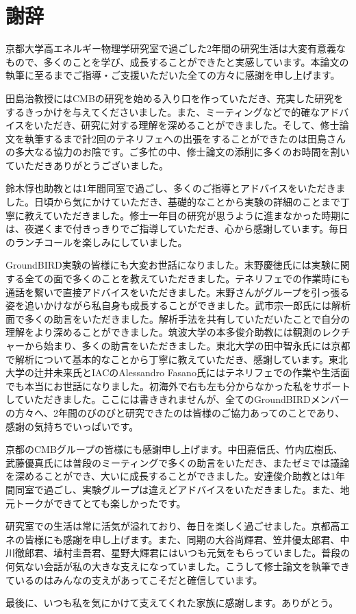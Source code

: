 \chapter{謝辞}

京都大学高エネルギー物理学研究室で過ごした2年間の研究生活は大変有意義なもので、多くのことを学び、成長することができたと実感しています。本論文の執筆に至るまでご指導・ご支援いただいた全ての方々に感謝を申し上げます。

田島治教授にはCMBの研究を始める入り口を作っていただき、充実した研究をするきっかけを与えてくださいました。また、ミーティングなどで的確なアドバイスをいただき、研究に対する理解を深めることができました。そして、修士論文を執筆するまで計2回のテネリフェへの出張をすることができたのは田島さんの多大なる協力のお陰です。ご多忙の中、修士論文の添削に多くのお時間を割いていただきありがとうございました。

鈴木惇也助教とは1年間同室で過ごし、多くのご指導とアドバイスをいただきました。日頃から気にかけていただき、基礎的なことから実験の詳細のことまで丁寧に教えていただきました。修士一年目の研究が思うように進まなかった時期には、夜遅くまで付きっきりでご指導していただき、心から感謝しています。毎日のランチコールを楽しみにしていました。

GroundBIRD実験の皆様にも大変お世話になりました。末野慶徳氏には実験に関する全ての面で多くのことを教えていただきました。テネリフェでの作業時にも通話を繋いで直接アドバイスをいただきました。末野さんがグループを引っ張る姿を追いかけながら私自身も成長することができました。武市宗一郎氏には解析面で多くの助言をいただきました。解析手法を共有していただいたことで自分の理解をより深めることができました。筑波大学の本多俊介助教には観測のレクチャーから始まり、多くの助言をいただきました。東北大学の田中智永氏には京都で解析について基本的なことから丁寧に教えていただき、感謝しています。東北大学の辻井未来氏とIACのAlessandro Fasano氏にはテネリフェでの作業や生活面でも本当にお世話になりました。初海外で右も左も分からなかった私をサポートしていただきました。ここには書ききれませんが、全てのGroundBIRDメンバーの方々へ、2年間のびのびと研究できたのは皆様のご協力あってのことであり、感謝の気持ちでいっぱいです。

京都のCMBグループの皆様にも感謝申し上げます。中田嘉信氏、竹内広樹氏、武藤優真氏には普段のミーティングで多くの助言をいただき、またゼミでは議論を深めることができ、大いに成長することができました。安達俊介助教とは1年間同室で過ごし、実験グループは違えどアドバイスをいただきました。また、地元トークができてとても楽しかったです。

研究室での生活は常に活気が溢れており、毎日を楽しく過ごせました。京都高エネの皆様にも感謝を申し上げます。また、同期の大谷尚輝君、笠井優太郎君、中川徹郎君、埴村圭吾君、星野大輝君にはいつも元気をもらっていました。普段の何気ない会話が私の大きな支えになっていました。こうして修士論文を執筆できているのはみんなの支えがあってこそだと確信しています。

最後に、いつも私を気にかけて支えてくれた家族に感謝します。ありがとう。
